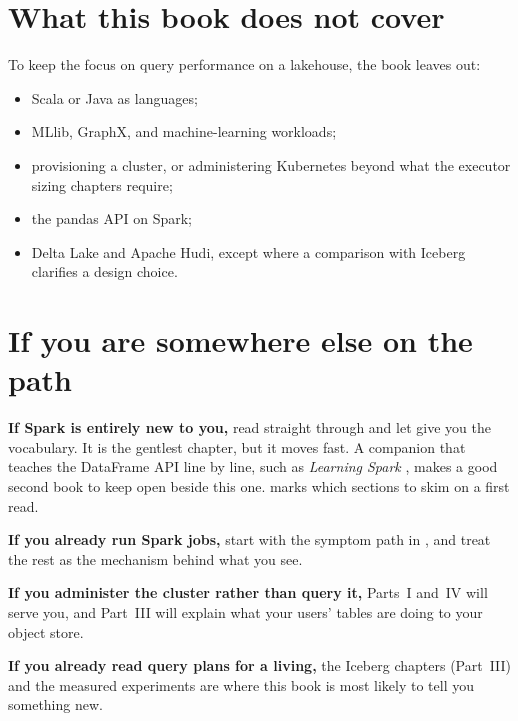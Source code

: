 \section*{What this book does not cover}

To keep the focus on query performance on a lakehouse, the book leaves out:

\begin{itemize}
  \item Scala or Java as languages;
  \item MLlib, GraphX, and machine-learning workloads;
  \item provisioning a cluster, or administering Kubernetes beyond what the
  executor sizing chapters require;
  \item the pandas API on Spark;
  \item Delta Lake and Apache Hudi, except where a comparison with Iceberg
  clarifies a design choice.
\end{itemize}

\section*{If you are somewhere else on the path}

\textbf{If Spark is entirely new to you,} read straight through and let
 give you the vocabulary. It is the gentlest chapter, but it moves
fast. A companion that teaches the DataFrame API line by line, such as
\emph{Learning Spark} \cite{DamjiEtAl2020}, makes a good second book to keep open
beside this one.  marks which sections to skim on a first read.

\textbf{If you already run Spark jobs,} start with the symptom path in
, and treat the rest as the mechanism behind what you see.

\textbf{If you administer the cluster rather than query it,} Parts~I and~IV will
serve you, and Part~III will explain what your users' tables are doing to your
object store.

\textbf{If you already read query plans for a living,} the Iceberg chapters
(Part~III) and the measured experiments are where this book is most likely to tell
you something new.

